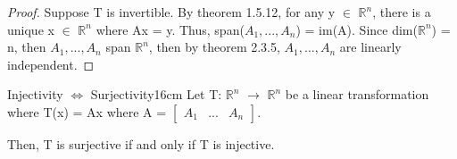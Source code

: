     \begin{proof}
        Suppose T is invertible.
        By {\color{red} theorem 1.5.12}, for any y $\in$ $\mathbb{R}^n$,
        there is a unique x $\in$ $\mathbb{R}^n$ where
        Ax = y. Thus, span($A_1,...,A_n$) = im(A).
        Since dim($\mathbb{R}^n$) = n, then $A_1,...,A_n$ span $\mathbb{R}^n$,
        then by {\color{red} theorem 2.3.5},
        $A_1,...,A_n$ are linearly independent.
    \end{proof}

    \vspace{0.5cm}



    \begin{wtheorem}{Injectivity $\Leftrightarrow$ Surjectivity}{16cm}
        Let T: $\mathbb{R}^n$ $\rightarrow$ $\mathbb{R}^n$
        be a linear transformation where T(x) = Ax
        where A =
        $\begin{bmatrix}
            A_1 & ... & A_n
        \end{bmatrix}$.

        Then, T is surjective if and only if T is injective.
    \end{wtheorem}

